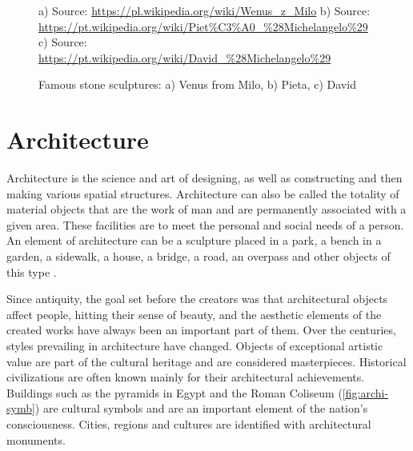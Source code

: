 \documentclass{report}
\begin{document}
\begin{figure}[h]
\center
a)  {Source: \url{https://pl.wikipedia.org/wiki/Wenus_z_Milo}}
b)  {Source: \url{https://pt.wikipedia.org/wiki/Piet\%C3\%A0_\%28Michelangelo\%29}}
c)  {Source: \url{https://pt.wikipedia.org/wiki/David_\%28Michelangelo\%29}}
\caption{Famous stone sculptures: a) Venus from Milo,
b) Pieta, c) David}
\label{fig:stone-sculp}
\end{figure}


\section{Architecture}

Architecture is the science and art of designing, as well as constructing and then making various spatial structures. Architecture can also be called the totality of material objects that are the work of man and are permanently associated with a given area. These facilities are to meet the personal and social needs of a person. An element of architecture can be a sculpture placed in a park, a bench in a garden, a sidewalk, a house, a bridge, a road, an overpass and other objects of this type \cite{BOOK:5}.

Since antiquity, the goal set before the creators was that architectural objects affect people, hitting their sense of beauty, and the aesthetic elements of the created works have always been an important part of them. Over the centuries, styles prevailing in architecture have changed. Objects of exceptional artistic value are part of the cultural heritage and are considered masterpieces. Historical civilizations are often known mainly for their architectural achievements. Buildings such as the pyramids in Egypt and the Roman Coliseum (\autoref{fig:archi-symb}) are cultural symbols and are an important element of the nation's consciousness. Cities, regions and cultures are identified with architectural monuments.
\end{document}
